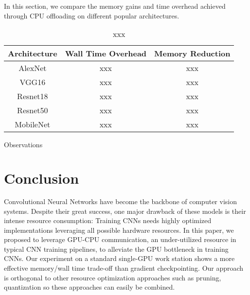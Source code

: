\documentclass[11pt,onecolumn]{article}
\begin{document}
In this section, we compare the memory gains and time overhead 
achieved through CPU offloading on different popular architectures.

\begin{table*}[h]
\begin{center}
\begin{tabular}{ c c c}	
\hline
Architecture            & Wall Time Overhead & Memory Reduction \\
\hline
AlexNet                    &  xxx   & xxx\\
VGG16                     &  xxx   & xxx\\
Resnet18       	          &  xxx   & xxx\\
Resnet50                  &  xxx   & xxx\\
MobileNet                 &  xxx   & xxx\\
\hline
\end{tabular}
\caption{xxx}
\end{center}
\end{table*}

Observations

\section{Conclusion}

Convolutional Neural Networks have become the backbone of computer vision systems.
Despite their great success, one major drawback of these models is their intense resource consumption:
Training CNNs needs highly optimized implementations leveraging all possible hardware resources.
In this paper, we proposed to leverage GPU-CPU communication, 
an under-utilized resource in typical CNN training pipelines,
to alleviate the GPU bottleneck in training CNNs. 
Our experiment on a standard single-GPU work station shows a more
effective memory/wall time trade-off than gradient checkpointing.
Our approach is orthogonal to other resource optimization approaches 
such as pruning, quantization so these approaches can easily be combined.
\end{document}

